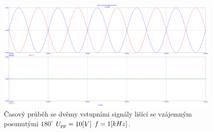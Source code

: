 \documentclass{article}
\begin{document}
\begin{figure}[H]
  \begin{minipage}[t]{\textwidth}
    \centering
    \includegraphics[width=\textwidth]{PC/ukol2/nula_vzstup.png}
    Časový průběh se dvěmy vstupními signály lišící se vzájemným posunutými \(180^\circ\) \(U_{pp} = 10\-[V]\) \(f = 1\-[kHz]\).
  \end{minipage}
\end{figure}
\end{document}
